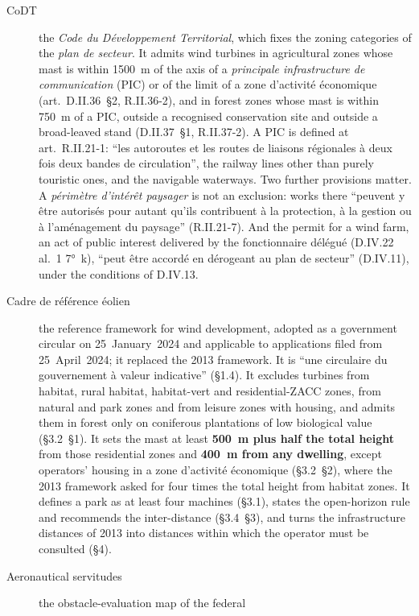 \documentclass[11pt,a4paper]{article}
\begin{document}
\begin{description}
  \item[CoDT] the \emph{Code du Développement Territorial}, which fixes the
    zoning categories of the \emph{plan de secteur}. It admits wind turbines in
    agricultural zones whose mast is within \SI{1500}{\metre} of the axis of a
    \emph{principale infrastructure de communication} (PIC) or of the limit of a
    zone d'activité économique (art.~D.II.36~§2, R.II.36-2), and in forest zones
    whose mast is within \SI{750}{\metre} of a PIC, outside a recognised
    conservation site and outside a broad-leaved stand (D.II.37~§1, R.II.37-2).
    A PIC is defined at art.~R.II.21-1: ``les autoroutes et les routes de
    liaisons régionales à deux fois deux bandes de circulation'', the railway
    lines other than purely touristic ones, and the navigable waterways. Two
    further provisions matter. A \emph{périmètre d'intérêt paysager} is not an
    exclusion: works there ``peuvent y être autorisés pour autant qu'ils
    contribuent à la protection, à la gestion ou à l'aménagement du paysage''
    (R.II.21-7). And the permit for a wind farm, an act of public interest
    delivered by the fonctionnaire délégué (D.IV.22 al.~1 7°~k), ``peut être
    accordé en dérogeant au plan de secteur'' (D.IV.11), under the conditions of
    D.IV.13.
  \item[Cadre de référence éolien] the reference framework for wind development,
    adopted as a government circular on 25~January~2024 and applicable to
    applications filed from 25~April~2024; it replaced the 2013 framework. It is
    ``une circulaire du gouvernement à valeur indicative'' (§1.4). It excludes
    turbines from habitat, rural habitat, habitat-vert and residential-ZACC
    zones, from natural and park zones and from leisure zones with housing, and
    admits them in forest only on coniferous plantations of low biological
    value (§3.2~§1). It sets the mast at least \textbf{\SI{500}{\metre} plus
    half the total height} from those residential zones and \textbf{\SI{400}{\metre}
    from any dwelling}, except operators' housing in a zone d'activité
    économique (§3.2~§2), where the 2013 framework asked for four times the
    total height from habitat zones. It defines a park as at least four
    machines (§3.1), states the open-horizon rule and recommends the
    inter-distance (§3.4~§3), and turns the infrastructure distances of 2013
    into distances within which the operator must be consulted (§4).
  \item[Aeronautical servitudes] the obstacle-evaluation map of the federal

\end{description}
\end{document}
